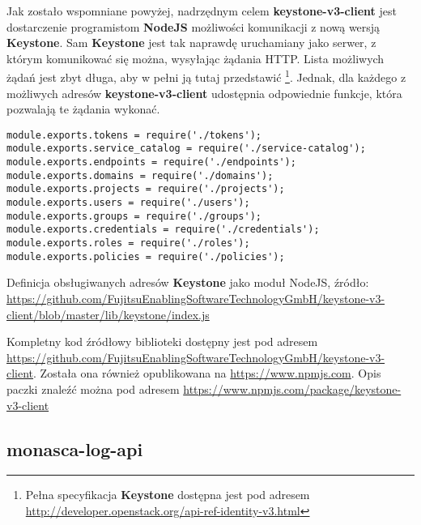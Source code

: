 Jak zostało wspomniane powyżej, nadrzędnym celem \textbf{keystone-v3-client} jest dostarczenie programistom \textbf{NodeJS} możliwości
komunikacji z nową wersją \textbf{Keystone}. Sam \textbf{Keystone} jest tak naprawdę uruchamiany jako serwer, z którym komunikować się można,
wysyłając żądania HTTP. Lista możliwych żądań jest zbyt długa, aby w pełni ją tutaj przedstawić 
\footnote{Pełna specyfikacja \textbf{Keystone} dostępna jest pod adresem \url{http://developer.openstack.org/api-ref-identity-v3.html}}. Jednak,
dla każdego z możliwych adresów \textbf{keystone-v3-client} udostępnia odpowiednie funkcje, która pozwalają te żądania wykonać.
    \begin{listing}
        \begin{verbatim}
module.exports.tokens = require('./tokens');
module.exports.service_catalog = require('./service-catalog');
module.exports.endpoints = require('./endpoints');
module.exports.domains = require('./domains');
module.exports.projects = require('./projects');
module.exports.users = require('./users');
module.exports.groups = require('./groups');
module.exports.credentials = require('./credentials');
module.exports.roles = require('./roles');
module.exports.policies = require('./policies');
        \end{verbatim}
        \caption[Definicja obsługiwanych adresów \textbf{Keystone}]{
            Definicja obsługiwanych adresów \textbf{Keystone} jako moduł NodeJS, źródło: \url{https://github.com/FujitsuEnablingSoftwareTechnologyGmbH/keystone-v3-client/blob/master/lib/keystone/index.js}}
        \label{chapter:application:own_work:keystone_v3_client:endpoints}
    \end{listing}

Kompletny kod źródłowy biblioteki dostępny jest pod adresem \url{https://github.com/FujitsuEnablingSoftwareTechnologyGmbH/keystone-v3-client}.
Została ona również opublikowana na \url{https://www.npmjs.com}. 
Opis paczki znaleźć można pod adresem \url{https://www.npmjs.com/package/keystone-v3-client}

\subsection{monasca-log-api}

